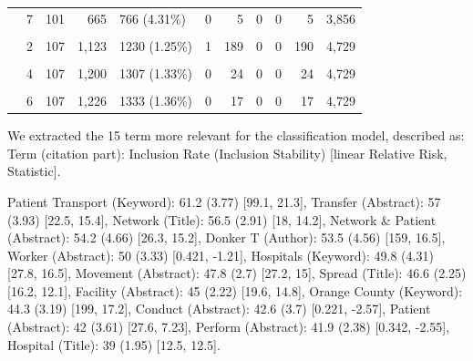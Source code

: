 \documentclass{article}
\begin{document}
\begin{table}[!h]
{\begin{tabular}[t]{llrrlrrrrrr}
 & 7 & 101 & 665 & 766 (4.31\%) & 0 & 5 & 0 & 0 & 5 & 3,856\\
\cellcolor{gray!6}{Session2 (n = 98371)} & \cellcolor{gray!6}{1} & \cellcolor{gray!6}{106} & \cellcolor{gray!6}{934} & \cellcolor{gray!6}{1040 (1.06\%)} & \cellcolor{gray!6}{5} & \cellcolor{gray!6}{270} & \cellcolor{gray!6}{998} & \cellcolor{gray!6}{0} & \cellcolor{gray!6}{1,273} & \cellcolor{gray!6}{4,729}\\
 & 2 & 107 & 1,123 & 1230 (1.25\%) & 1 & 189 & 0 & 0 & 190 & 4,729\\
\addlinespace
\cellcolor{gray!6}{} & \cellcolor{gray!6}{3} & \cellcolor{gray!6}{107} & \cellcolor{gray!6}{1,176} & \cellcolor{gray!6}{1283 (1.3\%)} & \cellcolor{gray!6}{0} & \cellcolor{gray!6}{53} & \cellcolor{gray!6}{0} & \cellcolor{gray!6}{0} & \cellcolor{gray!6}{53} & \cellcolor{gray!6}{4,733}\\
 & 4 & 107 & 1,200 & 1307 (1.33\%) & 0 & 24 & 0 & 0 & 24 & 4,729\\
\cellcolor{gray!6}{} & \cellcolor{gray!6}{5} & \cellcolor{gray!6}{107} & \cellcolor{gray!6}{1,209} & \cellcolor{gray!6}{1316 (1.34\%)} & \cellcolor{gray!6}{0} & \cellcolor{gray!6}{9} & \cellcolor{gray!6}{0} & \cellcolor{gray!6}{0} & \cellcolor{gray!6}{9} & \cellcolor{gray!6}{4,729}\\
 & 6 & 107 & 1,226 & 1333 (1.36\%) & 0 & 17 & 0 & 0 & 17 & 4,729\\
\bottomrule
\end{tabular}}
\end{table}

We extracted the 15 term more relevant for the classification model,
described as: Term (citation part): Inclusion Rate (Inclusion Stability)
{[}linear Relative Risk, Statistic{]}.

Patient Transport (Keyword): 61.2 (3.77) {[}99.1, 21.3{]}, Transfer
(Abstract): 57 (3.93) {[}22.5, 15.4{]}, Network (Title): 56.5 (2.91)
{[}18, 14.2{]}, Network \& Patient (Abstract): 54.2 (4.66) {[}26.3,
15.2{]}, Donker T (Author): 53.5 (4.56) {[}159, 16.5{]}, Worker
(Abstract): 50 (3.33) {[}0.421, -1.21{]}, Hospitals (Keyword): 49.8
(4.31) {[}27.8, 16.5{]}, Movement (Abstract): 47.8 (2.7) {[}27.2, 15{]},
Spread (Title): 46.6 (2.25) {[}16.2, 12.1{]}, Facility (Abstract): 45
(2.22) {[}19.6, 14.8{]}, Orange County (Keyword): 44.3 (3.19) {[}199,
17.2{]}, Conduct (Abstract): 42.6 (3.7) {[}0.221, -2.57{]}, Patient
(Abstract): 42 (3.61) {[}27.6, 7.23{]}, Perform (Abstract): 41.9 (2.38)
{[}0.342, -2.55{]}, Hospital (Title): 39 (1.95) {[}12.5, 12.5{]}.
\end{document}
